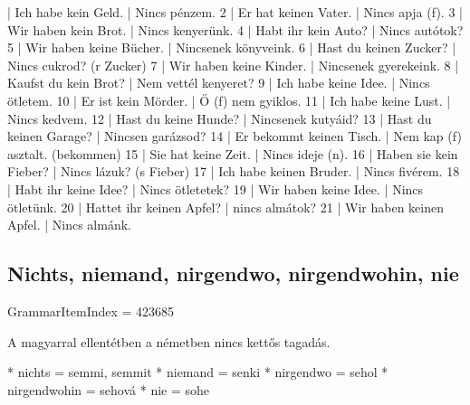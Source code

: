\documentclass{article}
\newenvironment{desc}{\verbatim}{\endverbatim}
\newenvironment{exmp}{\verbatim}{\endverbatim}
\begin{document}
\begin{exmp}
1 | Ich habe kein Geld. | Nincs pénzem.
2 | Er hat keinen Vater. | Nincs apja (f).
3 | Wir haben kein Brot. | Nincs kenyerünk.
4 | Habt ihr kein Auto? | Nincs autótok?
5 | Wir haben keine Bücher. | Nincsenek könyveink.
6 | Hast du keinen Zucker? | Nincs cukrod? (r Zucker)
7 | Wir haben keine Kinder. | Nincsenek gyerekeink.
8 | Kaufst du kein Brot? | Nem vettél kenyeret?
9 | Ich habe keine Idee. | Nincs ötletem.
10 | Er ist kein Mörder. | Ő (f) nem gyiklos.
11 | Ich habe keine Lust. | Nincs kedvem.
12 | Hast du keine Hunde? | Nincsenek kutyáid?
13 | Hast du keinen Garage? | Nincsen garázsod?
14 | Er bekommt keinen Tisch. | Nem kap (f) asztalt. (bekommen)
15 | Sie hat keine Zeit. | Nincs ideje (n).
16 | Haben sie kein Fieber? | Nincs lázuk? (s Fieber)
17 | Ich habe keinen Bruder. | Nincs fivérem.
18 | Habt ihr keine Idee? | Nincs ötletetek?
19 | Wir haben keine Idee. | Nincs ötletünk.
20 | Hattet ihr keinen Apfel? | nincs almátok?
21 | Wir haben keinen Apfel. | Nincs almánk.
\end{exmp}

\subsection{Nichts, niemand, nirgendwo, nirgendwohin, nie}

GrammarItemIndex = 423685

\begin{desc}
A magyarral ellentétben a németben nincs kettős tagadás.

* nichts = semmi, semmit
* niemand = senki
* nirgendwo = sehol
* nirgendwohin = sehová
* nie = sohe
\end{desc}
\end{document}
